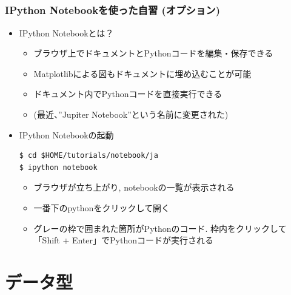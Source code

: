 \subsection*{\redm\whiteb\greenb}
\begin{frame}[t, fragile]
\frametitle{IPython Notebookを使った自習 (オプション)}
\begin{itemize}
\item IPython Notebookとは？
  \begin{itemize}
  \item ブラウザ上でドキュメントとPythonコードを編集・保存できる
  \item Matplotlibによる図もドキュメントに埋め込むことが可能
  \item ドキュメント内でPythonコードを直接実行できる
  \item (最近、''Jupiter Notebook''という名前に変更された)
  \end{itemize}
\item IPython Notebookの起動
\begin{lstlisting}
$ cd $HOME/tutorials/notebook/ja
$ ipython notebook
\end{lstlisting}	 
  \begin{itemize}
  \item ブラウザが立ち上がり, notebookの一覧が表示される
  \item 一番下のpythonをクリックして開く
  \item グレーの枠で囲まれた箇所がPythonのコード. 枠内をクリックして「Shift + Enter」でPythonコードが実行される
  \end{itemize}
\end{itemize}
\end{frame}

\section{データ型}

